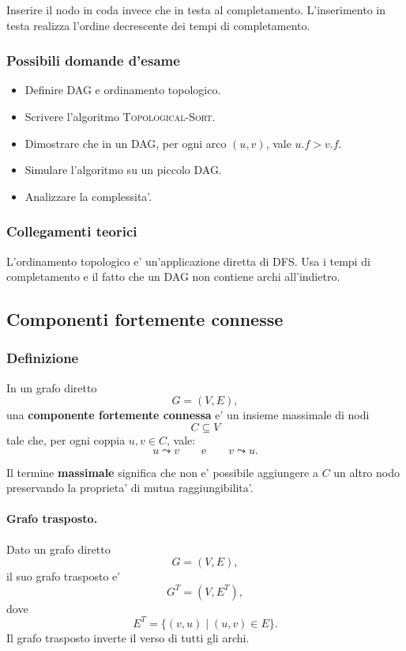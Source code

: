 \begin{hardnote}
Inserire il nodo in coda invece che in testa al completamento. L'inserimento in testa realizza l'ordine decrescente dei tempi di completamento.
\end{hardnote}

\subsubsection{Possibili domande d'esame}
\begin{itemize}
	\item Definire DAG e ordinamento topologico.
	\item Scrivere l'algoritmo \textsc{Topological-Sort}.
	\item Dimostrare che in un DAG, per ogni arco $(u,v)$, vale $u.f>v.f$.
	\item Simulare l'algoritmo su un piccolo DAG.
	\item Analizzare la complessita'.
\end{itemize}

\subsubsection{Collegamenti teorici}
L'ordinamento topologico e' un'applicazione diretta di DFS. Usa i tempi di completamento e il fatto che un DAG non contiene archi all'indietro.

\subsection{Componenti fortemente connesse}

\subsubsection{Definizione}
In un grafo diretto
\[
G=(V,E),
\]
una \textbf{componente fortemente connessa} e' un insieme massimale di nodi
\[
C\subseteq V
\]
tale che, per ogni coppia $u,v\in C$, vale:
\[
u\leadsto v
\qquad\text{e}\qquad
v\leadsto u.
\]

Il termine \textbf{massimale} significa che non e' possibile aggiungere a $C$ un altro nodo preservando la proprieta' di mutua raggiungibilita'.

\paragraph{Grafo trasposto.}
Dato un grafo diretto
\[
G=(V,E),
\]
il suo grafo trasposto e'
\[
G^T=(V,E^T),
\]
dove
\[
E^T=\{(v,u)\mid (u,v)\in E\}.
\]
Il grafo trasposto inverte il verso di tutti gli archi.

